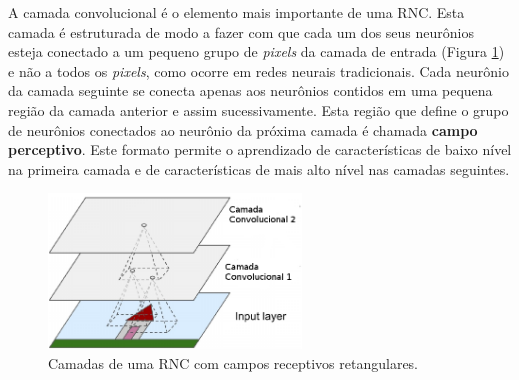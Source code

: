 A camada convolucional é o elemento mais importante de uma RNC. Esta camada é estruturada
de modo a fazer com que cada um dos seus neurônios esteja conectado a um 
pequeno grupo de \textit{pixels} da camada de entrada (Figura \ref{fig:cnn_arq}) e não a todos os \textit{pixels}, como
ocorre em redes neurais tradicionais. Cada neurônio da camada seguinte se conecta apenas aos neurônios
contidos em uma pequena região da camada anterior e assim sucessivamente. Esta região que define
o grupo de neurônios conectados ao neurônio da próxima camada é chamada \textbf{campo perceptivo}.
Este formato permite o aprendizado de características de baixo nível na primeira camada e de
características de mais alto nível nas camadas seguintes.
\begin{figure}[htp]
\begin{center}
  \includegraphics[width=0.6\textwidth]{fig/cnn_arq}
  \caption{Camadas de uma RNC com campos receptivos retangulares. \citep{aurelien17}}
  \label{fig:cnn_arq}
\end{center}
\end{figure}

